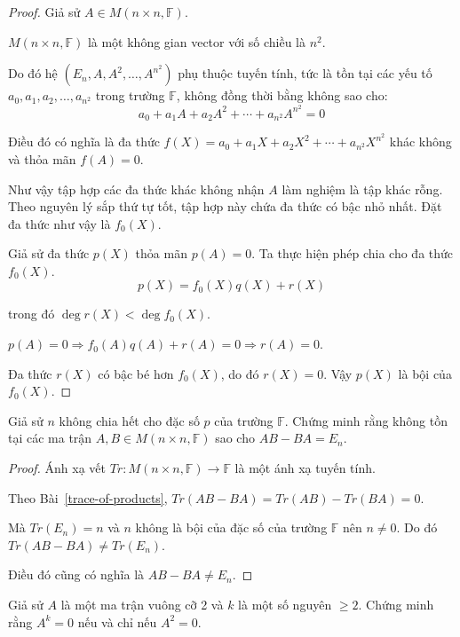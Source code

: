 \documentclass[class=nhvh-linear-algebra,crop=false]{standalone}
\begin{document}
\begin{proof}
    Giả sử $A\in M(n\times n,\mathbb{F})$.
    \par $M(n\times n,\mathbb{F})$ là một không gian vector với số chiều là $n^{2}$.
    \par Do đó hệ $(E_{n}, A, A^{2}, \ldots, A^{n^{2}})$ phụ thuộc tuyến tính, tức là tồn tại các yếu tố $a_{0}, a_{1}, a_{2}, \ldots, a_{n^{2}}$ trong trường $\mathbb{F}$, không đồng thời bằng không sao cho:
    \[
        a_{0} + a_{1}A + a_{2}A^{2} + \cdots + a_{n^{2}}A^{n^{2}} = 0
    \]
    \par Điều đó có nghĩa là đa thức $f(X) = a_{0} + a_{1}X + a_{2}X^{2} + \cdots + a_{n^{2}}X^{n^{2}}$ khác không và thỏa mãn $f(A) = 0$.
    \par Như vậy tập hợp các đa thức khác không nhận $A$ làm nghiệm là tập khác rỗng. Theo nguyên lý sắp thứ tự tốt, tập hợp này chứa đa thức có bậc nhỏ nhất. Đặt đa thức như vậy là $f_{0}(X)$.
    \par Giả sử đa thức $p(X)$ thỏa mãn $p(A) = 0$. Ta thực hiện phép chia cho đa thức $f_{0}(X)$.
    \[
        p(X) = f_{0}(X)q(X) + r(X)
    \]
    \par trong đó $\deg r(X) < \deg f_{0}(X)$.
    \par $p(A) = 0\Rightarrow f_{0}(A)q(A) + r(A) = 0 \Rightarrow r(A) = 0$.
    \par Đa thức $r(X)$ có bậc bé hơn $f_{0}(X)$, do đó $r(X) = 0$. Vậy $p(X)$ là bội của $f_{0}(X)$.
\end{proof}

\begin{exercise}
    Giả sử $n$ không chia hết cho đặc số $p$ của trường $\mathbb{F}$. Chứng minh rằng không tồn tại các ma trận $A, B\in M(n\times n, \mathbb{F})$ sao cho $AB - BA = E_{n}$.
\end{exercise}

\begin{proof}
    Ánh xạ vết $Tr: M(n\times n, \mathbb{F})\rightarrow \mathbb{F}$ là một ánh xạ tuyến tính.
    \par Theo Bài~\ref{trace-of-products}, $Tr(AB - BA) = Tr(AB) - Tr(BA) = 0$.
    \par Mà $Tr(E_{n}) = n$ và $n$ không là bội của đặc số của trường $\mathbb{F}$ nên $n\ne 0$. Do đó $Tr(AB - BA)\ne Tr(E_{n})$.
    \par Điều đó cũng có nghĩa là $AB - BA \ne E_{n}$.
\end{proof}

\begin{exercise}
    Giả sử $A$ là một ma trận vuông cỡ 2 và $k$ là một số nguyên $\ge 2$. Chứng minh rằng $A^{k} = 0$ nếu và chỉ nếu $A^{2} = 0$.
\end{exercise}
\end{document}
